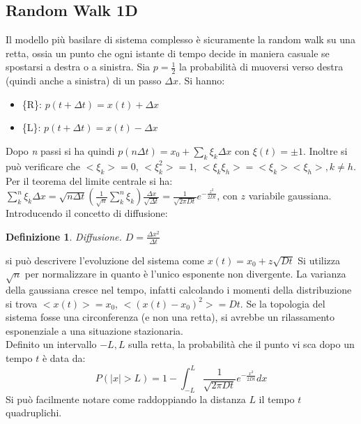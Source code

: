 \documentclass[12pt, a4paper]{book}
\theoremstyle{theorem}
\newtheorem{definition}{Definizione}[section]
\begin{document}
			\subsection{Random Walk 1D}
				Il modello più basilare di sistema complesso è sicuramente la random walk su una retta, ossia un punto che ogni istante di tempo decide in maniera casuale se spostarsi a destra o a sinistra.
				Sia $p=\frac{1}{2}$ la probabilità di muoversi verso destra (quindi anche a sinistra) di un passo $\Delta x$. Si hanno:
				\begin{itemize}
					\item \{R\}: $p(t+\Delta t)=x(t)+\Delta x$
					\item \{L\}: $p(t+\Delta t)=x(t)-\Delta x$
				\end{itemize}
				Dopo \textit{n} passi si ha quindi $p(n\Delta t)=x_0+\sum_k\xi_k\Delta x$ con $\xi(t)=\pm 1$.
				Inoltre si può verificare che $<\xi_k>=0$, $<\xi_k^2>=1$, $<\xi_k\xi_h>=<\xi_k><\xi_h>, k\neq h$.
				Per il teorema del limite centrale si ha:
				$\sum_k^n\xi_k\Delta x=\sqrt{n\Delta t}\left(\frac{1}{\sqrt{n}}\sum_k^n\xi_k\right)\frac{\Delta x}{\sqrt{\Delta t}}=\frac{1}{\sqrt{2\pi Dt}}e^{-\frac{z^2}{2Dt}}$, con $z$ variabile gaussiana.
				Introducendo il concetto di diffusione:\\
				\begin{definition}
					Diffusione. $D=\frac{\Delta x^2}{\Delta t}$
				\end{definition}
				si può descrivere l'evoluzione del sistema come $x(t)=x_0+z\sqrt{Dt}$
				Si utilizza $\sqrt{n}$ per normalizzare in quanto è l'unico esponente non divergente.
				La varianza della gaussiana cresce nel tempo, infatti calcolando i momenti della distribuzione si trova $<x(t)>=x_0$, $<(x(t)-x_0)^2>=Dt$.
				Se la topologia del sistema fosse una circonferenza (e non una retta), si avrebbe un rilassamento esponenziale a una situazione stazionaria.
				\\Definito un intervallo $-L,L$ sulla retta, la probabilità che il punto vi sca dopo un tempo $t$ è data da:
				\begin{equation}
					P(\left\lvert x\right\rvert >L)=1-\int_{-L}^{L}\frac{1}{\sqrt{2\pi Dt}}e^{-\frac{x^2}{2Dt}}dx
				\end{equation}
				Si può facilmente notare come raddoppiando la distanza $L$ il tempo $t$ quadruplichi.
\end{document}
